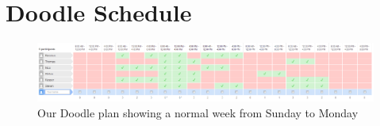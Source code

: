 \section{Doodle Schedule} \label{sec:appendix-doodle-schedule}

\begin{figure}[ht]
\centering
\includegraphics[width=\columnwidth]{images/doodle-plan.png}
\caption{Our Doodle plan showing a normal week from Sunday to Monday}
\label{fig:appendix-doodle-schedule}
\end{figure}
